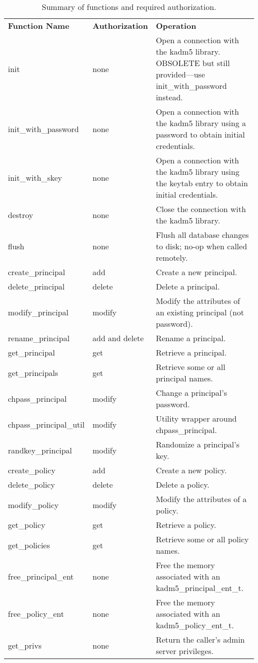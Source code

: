 \begin{table}[htbp]
\caption{Summary of functions and required authorization.}
\label{tab:func-overview}
\begin{tabular}{@{}llp{3.24in}}
\\
{\bf Function Name} & {\bf Authorization} & {\bf Operation} \\

init & none & Open a connection with the kadm5 library.  OBSOLETE
but still provided---use init_with_password instead. \\
init_with_password & none & Open a connection with the kadm5
library using a password to obtain initial credentials. \\
init_with_skey & none & Open a connection with the kadm5 library
using the keytab entry to obtain initial credentials. \\
destroy & none & Close the connection with the kadm5 library. \\
flush & none & Flush all database changes to disk; no-op when called
remotely. \\
create_principal & add & Create a new principal. \\
delete_principal & delete & Delete a principal. \\
modify_principal & modify & Modify the attributes of an existing
        principal (not password). \\
rename_principal & add and delete & Rename a principal. \\
get_principal & get\footnotemark & Retrieve a principal. \\
get_principals & get & Retrieve some or all principal names. \\
chpass_principal & modify\footnotemark[\thefootnote] &
         Change a principal's password. \\
chpass_principal_util & modify\footnotemark[\thefootnote] & Utility wrapper around chpass_principal. \\
randkey_principal & modify\footnotemark[\thefootnote] &
        Randomize a principal's key. \\
create_policy & add & Create a new policy. \\
delete_policy & delete & Delete a policy. \\
modify_policy & modify & Modify the attributes of a policy. \\
get_policy & get & Retrieve a policy. \\
get_policies & get & Retrieve some or all policy names. \\
free_principal_ent & none & Free the memory associated with an
                kadm5_principal_ent_t. \\
free_policy_ent & none & Free the memory associated with an
                kadm5_policy_ent_t. \\
get_privs & none & Return the caller's admin server privileges.
\end{tabular}
\end{table}

